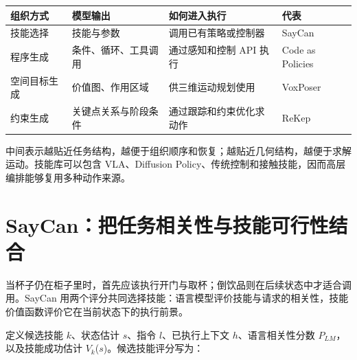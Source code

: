 \documentclass[UTF8,a4paper,11pt,oneside,openany,fontset=none]{ctexbook}
\begin{document}
{\small %
\begin{longtable}[]{@{}
  >{\raggedright\arraybackslash}p{}
  >{\raggedright\arraybackslash}p{}
  >{\raggedright\arraybackslash}p{}
  >{\raggedright\arraybackslash}p{}@{}}
\toprule\noalign{}
\begin{minipage}[b]{\linewidth}\raggedright
组织方式
\end{minipage} & \begin{minipage}[b]{\linewidth}\raggedright
模型输出
\end{minipage} & \begin{minipage}[b]{\linewidth}\raggedright
如何进入执行
\end{minipage} & \begin{minipage}[b]{\linewidth}\raggedright
代表
\end{minipage} \\
\midrule\noalign{}
\endhead
\bottomrule\noalign{}
\endlastfoot
技能选择 & 技能与参数 & 调用已有策略或控制器 & SayCan \\
程序生成 & 条件、循环、工具调用 & 通过感知和控制 API 执行 & Code as Policies \\
空间目标生成 & 价值图、作用区域 & 供三维运动规划使用 & VoxPoser \\
约束生成 & 关键点关系与阶段条件 & 通过跟踪和约束优化求动作 & ReKep \\
\end{longtable}
}

中间表示越贴近任务结构，越便于组织顺序和恢复；越贴近几何结构，越便于求解运动。技能库可以包含 VLA、Diffusion Policy、传统控制和接触技能，因而高层编排能够复用多种动作来源。

\section{SayCan：把任务相关性与技能可行性结合}\label{saycanux628aux4efbux52a1ux76f8ux5173ux6027ux4e0eux6280ux80fdux53efux884cux6027ux7ed3ux5408}

当杯子仍在柜子里时，首先应该执行开门与取杯；倒饮品则在后续状态中才适合调用。SayCan 用两个评分共同选择技能：语言模型评价技能与请求的相关性，技能价值函数评价它在当前状态下的执行前景。\cite{R21}

定义候选技能 \(k\)、状态估计 \(s\)、指令 \(l\)、已执行上下文 \(h\)、语言相关性分数 \(P_{LM}\)，以及技能成功估计 \(V_{k}\)(\(s\))。候选技能评分写为：
\end{document}
